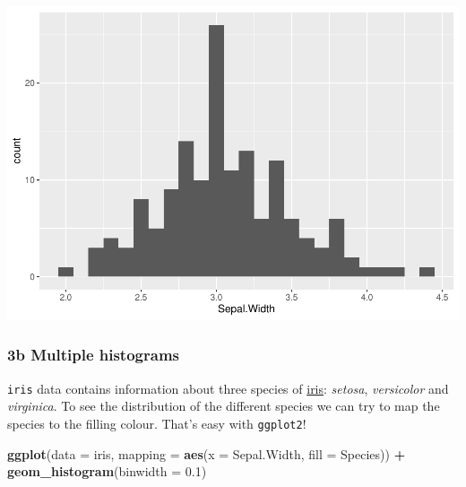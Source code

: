 \documentclass[
]{article}
\newenvironment{Shaded}{\begin{snugshade}}{\end{snugshade}}
\newcommand{\AttributeTok}[1]{\textcolor[rgb]{0.13,0.29,0.53}{#1}}
\newcommand{\FloatTok}[1]{\textcolor[rgb]{0.00,0.00,0.81}{#1}}
\newcommand{\FunctionTok}[1]{\textcolor[rgb]{0.13,0.29,0.53}{\textbf{#1}}}
\newcommand{\NormalTok}[1]{#1}
\newcommand{\SpecialCharTok}[1]{\textcolor[rgb]{0.81,0.36,0.00}{\textbf{#1}}}
\begin{document}
\begin{center}\includegraphics{P1_exercises_files/figure-latex/histogram-1} \end{center}

\subsubsection{\texorpdfstring{\textbf{3b} \textbar{} Multiple
histograms}{3b \textbar{} Multiple histograms}}\label{b-multiple-histograms}

\texttt{iris} data contains information about three species of
\href{https://en.wikipedia.org/wiki/Iris_(plant)}{iris}: \emph{setosa},
\emph{versicolor} and \emph{virginica}. To see the distribution of the
different species we can try to map the species to the filling colour.
That's easy with \texttt{ggplot2}!

\begin{Shaded}
\begin{Highlighting}[]
\FunctionTok{ggplot}\NormalTok{(}\AttributeTok{data =}\NormalTok{ iris, }\AttributeTok{mapping =} \FunctionTok{aes}\NormalTok{(}\AttributeTok{x =}\NormalTok{ Sepal.Width, }\AttributeTok{fill =}\NormalTok{ Species)) }\SpecialCharTok{+}
  \FunctionTok{geom\_histogram}\NormalTok{(}\AttributeTok{binwidth =} \FloatTok{0.1}\NormalTok{) }
\end{Highlighting}
\end{Shaded}
\end{document}
